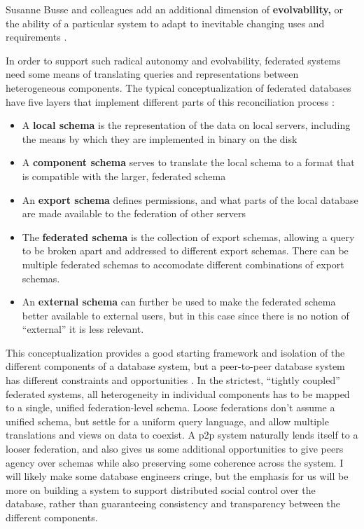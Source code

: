 Susanne Busse and colleagues add an additional dimension of
\textbf{evolvability,} or the ability of a particular system to adapt to
inevitable changing uses and requirements \citep{busseFederatedInformationSystems1999} .

In order to support such radical autonomy and evolvability, federated
systems need some means of translating queries and representations
between heterogeneous components. The typical conceptualization of
federated databases have five layers that implement different parts of
this reconciliation process \citep{shethFederatedDatabaseSystems1990} :

\begin{itemize}
\tightlist
\item
  A \textbf{local schema} is the representation of the data on local
  servers, including the means by which they are implemented in binary
  on the disk
\item
  A \textbf{component schema} serves to translate the local schema to a
  format that is compatible with the larger, federated schema
\item
  An \textbf{export schema} defines permissions, and what parts of the
  local database are made available to the federation of other servers
\item
  The \textbf{federated schema} is the collection of export schemas,
  allowing a query to be broken apart and addressed to different export
  schemas. There can be multiple federated schemas to accomodate
  different combinations of export schemas.
\item
  An \textbf{external schema} can further be used to make the federated
  schema better available to external users, but in this case since
  there is no notion of ``external'' it is less relevant.
\end{itemize}

This conceptualization provides a good starting framework and isolation
of the different components of a database system, but a peer-to-peer
database system has different constraints and opportunities \citep{bonifatiDistributedDatabasesPeertopeer2008} . In the strictest,
``tightly coupled'' federated systems, all heterogeneity in individual
components has to be mapped to a single, unified federation-level
schema. Loose federations don't assume a unified schema, but settle for
a uniform query language, and allow multiple translations and views on
data to coexist. A p2p system naturally lends itself to a looser
federation, and also gives us some additional opportunities to give
peers agency over schemas while also preserving some coherence across
the system. I will likely make some database engineers cringe, but the
emphasis for us will be more on building a system to support distributed
social control over the database, rather than guaranteeing consistency
and transparency between the different components.

